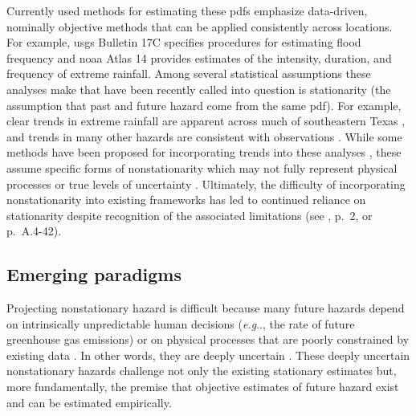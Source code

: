 \documentclass[11pt]{article}
\makeatletter
\DeclareRobustCommand\onedot{\futurelet\@let@token\@onedot}
\def\@onedot{\ifx\@let@token.\else.\null\fi\xspace}
\def\eg{\emph{e.g}\onedot} \def\Eg{\emph{E.g}\onedot}
\DeclareRobustCommand\onedot{\futurelet\@let@token\@onedot}
\def\@onedot{\ifx\@let@token.\else.\null\fi\xspace}
\def\eg{\emph{e.g}\onedot} \def\Eg{\emph{E.g}\onedot}
\makeatother
\begin{document}
Currently used methods for estimating these \glspl{pdf} emphasize data-driven, nominally objective methods that can be applied consistently across locations.
For example, \gls{usgs} Bulletin 17C specifies procedures for estimating flood frequency and \gls{noaa} Atlas 14 provides estimates of the intensity, duration, and frequency of extreme rainfall.
Among several statistical assumptions these analyses make that have been recently called into question \citep[see][for a review]{Merz:2014gf} is stationarity (the assumption that past and future hazard come from the same \gls{pdf}).
For example, clear trends in extreme rainfall are apparent across much of southeastern Texas \citep{fagnant_spatiotemporal:2020,nielsen-gammon_txrainfall:2020}, and trends in many other hazards are consistent with observations \citep[see][for a comprehensive summary]{ipcc_impacts:2022}.
While some methods have been proposed for incorporating trends into these analyses \citep[see][for a review]{Salas:2018ge}, these assume specific forms of nonstationarity which may not fully represent physical processes or true levels of uncertainty \citep{DossGollin:2019,Montanari:2014hl,Serinaldi:2015bq}.
Ultimately, the difficulty of incorporating nonstationarity into existing frameworks has led to continued reliance on stationarity despite recognition of the associated limitations (see \cite{bulletin17c:2019}, p.~2, or \cite{atlas14_texas:2018} p.~A.4-42).

\subsection{Emerging paradigms}

Projecting nonstationary hazard is difficult because many future hazards depend on intrinsically unpredictable human decisions (\eg, the rate of future greenhouse gas emissions) or on physical processes that are poorly constrained by existing data \citep[\eg, collapse of the West Antarctic ice sheet; see][]{deconto_antarctica:2016}.
In other words, they are deeply uncertain \citep{keller_management:2021,walker_deep:2013,lempert_complex:2002}.
These deeply uncertain nonstationary hazards challenge not only the existing stationary estimates but, more fundamentally, the premise that objective estimates of future hazard exist and can be estimated empirically.
\end{document}
